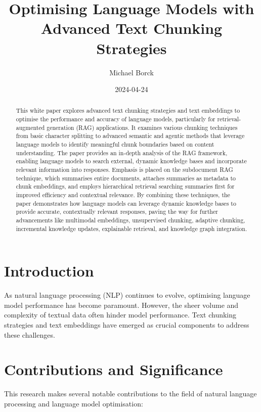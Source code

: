 \documentclass[
  letterpaper,
  DIV=11,
  numbers=noendperiod]{scrartcl}
\title{Optimising Language Models with Advanced Text Chunking
Strategies}
\author{Michael Borck}
\date{2024-04-24}
\begin{document}
\maketitle
\begin{abstract}
This white paper explores advanced text chunking strategies and text
embeddings to optimise the performance and accuracy of language models,
particularly for retrieval-augmented generation (RAG) applications. It
examines various chunking techniques from basic character splitting to
advanced semantic and agentic methods that leverage language models to
identify meaningful chunk boundaries based on content understanding. The
paper provides an in-depth analysis of the RAG framework, enabling
language models to search external, dynamic knowledge bases and
incorporate relevant information into responses. Emphasis is placed on
the subdocument RAG technique, which summarises entire documents,
attaches summaries as metadata to chunk embeddings, and employs
hierarchical retrieval searching summaries first for improved efficiency
and contextual relevance. By combining these techniques, the paper
demonstrates how language models can leverage dynamic knowledge bases to
provide accurate, contextually relevant responses, paving the way for
further advancements like multimodal embeddings, unsupervised chunking,
adaptive chunking, incremental knowledge updates, explainable retrieval,
and knowledge graph integration.
\end{abstract}

\section{Introduction}\label{introduction}

As natural language processing (NLP) continues to evolve, optimising
language model performance has become paramount. However, the sheer
volume and complexity of textual data often hinder model performance.
Text chunking strategies and text embeddings have emerged as crucial
components to address these challenges.

\section{Contributions and
Significance}\label{contributions-and-significance}

This research makes several notable contributions to the field of
natural language processing and language model optimisation:
\end{document}
